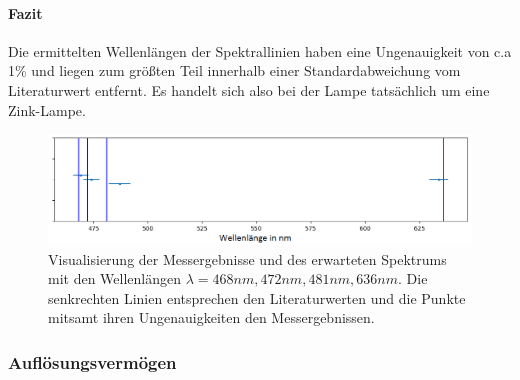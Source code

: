 \documentclass[12pt,a4paper]{article}
\begin{document}
\paragraph{Fazit}
Die ermittelten Wellenlängen der Spektrallinien haben eine Ungenauigkeit von c.a 1\% und liegen zum größten Teil innerhalb einer Standardabweichung vom Literaturwert entfernt. Es handelt sich also bei der Lampe tatsächlich um eine Zink-Lampe.
\begin{figure}
\includegraphics[scale=0.8]{Bilder/Spektrum_Zink.png}
\caption{Visualisierung der Messergebnisse und des erwarteten Spektrums mit den Wellenlängen $\lambda = 468nm, 472nm, 481nm, 636nm$. Die senkrechten Linien entsprechen den Literaturwerten und die Punkte mitsamt ihren Ungenauigkeiten den Messergebnissen.}
\label{fig:Spektrum_Zink}
\end{figure}
\subsubsection{Auflösungsvermögen}
\end{document}
